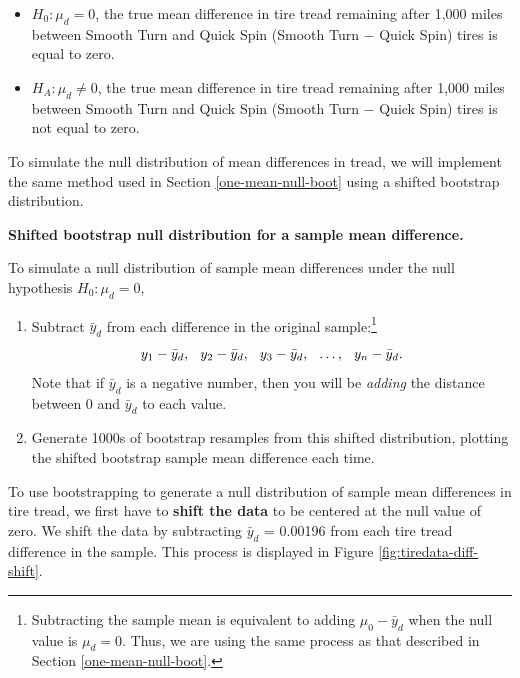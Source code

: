 \documentclass[
  10pt,
  openany]{book}
\providecommand{\tightlist}{%
  \setlength{\itemsep}{0pt}\setlength{\parskip}{0pt}}
\theoremstyle{definition}
\theoremstyle{definition}
\theoremstyle{definition}
\theoremstyle{definition}
\theoremstyle{remark}
\begin{document}
\begin{itemize}
\tightlist
\item
  \(H_0: \mu_d = 0\), the true mean difference in tire tread remaining after 1,000 miles between Smooth Turn and Quick Spin (Smooth Turn \(-\) Quick Spin) tires is equal to zero.\\
\item
  \(H_A: \mu_d \neq 0\), the true mean difference in tire tread remaining after 1,000 miles between Smooth Turn and Quick Spin (Smooth Turn \(-\) Quick Spin) tires is not equal to zero.
\end{itemize}

To simulate the null distribution of mean differences in tread, we will implement the same method used in Section \ref{one-mean-null-boot} using a shifted bootstrap distribution.

\textbf{Shifted bootstrap null distribution for a sample mean difference.}

To simulate a null distribution of sample mean differences under the null hypothesis \(H_0: \mu_d = 0\),

\begin{enumerate}
\def\labelenumi{\arabic{enumi}.}
\tightlist
\item
  Subtract \(\bar{y}_d\) from each difference in the original sample:\footnote{Subtracting the sample mean is equivalent to adding \(\mu_0 - \bar{y}_d\) when the null value is \(\mu_d = 0\). Thus, we are using the same process as that described in Section \ref{one-mean-null-boot}.}\\
  \[
   y_1 - \bar{y}_d , \hspace{2.5mm} y_2 - \bar{y}_d, \hspace{2.5mm}  y_3 - \bar{y}_d, \hspace{2.5mm}  \ldots, \hspace{2.5mm}  y_n - \bar{y}_d.
    \]
  Note that if \(\bar{y}_d\) is a negative number, then you will be \emph{adding} the distance between \(0\) and \(\bar{y}_d\) to each value.
\item
  Generate 1000s of bootstrap resamples from this shifted distribution, plotting the shifted bootstrap sample mean difference each time.
\end{enumerate}

To use bootstrapping to generate a null distribution of sample mean differences in tire tread, we first have to \textbf{shift the data} to be centered at the null value of zero. We shift the data by subtracting \(\bar{y}_d\) = 0.00196 from each tire tread difference in the sample. This process is displayed in Figure \ref{fig:tiredata-diff-shift}.
\end{document}
